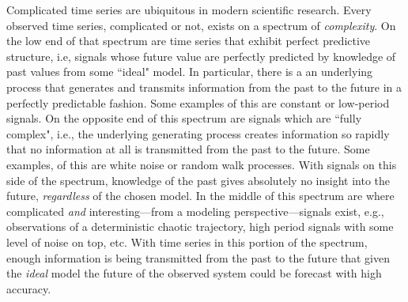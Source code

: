 



%


Complicated time series are ubiquitous in modern scientific research.
Every observed time series, complicated or not, exists on a spectrum of \emph{complexity}. On the low end of that spectrum are time series that exhibit perfect predictive structure, i.e, signals whose future value are perfectly predicted by knowledge of past values from some ``ideal" model. In particular, there is a an underlying process that generates and transmits information from the past to the future in a perfectly predictable fashion. Some examples of this are constant or low-period signals. On the opposite end of this spectrum are signals which are ``fully complex", i.e., the underlying generating process creates information so rapidly that no information at all is transmitted from the past to the future. Some examples, of this are white noise or random walk processes. With signals on this side of the spectrum, knowledge of the past gives absolutely no insight into the future, \emph{regardless} of the chosen model.  In the middle of this spectrum are where complicated \emph{and} interesting---from a modeling perspective---signals exist, e.g., observations of a deterministic chaotic trajectory, high period signals with some level of noise on top, etc. With time series in this portion of the spectrum, enough information is being transmitted from the past to the future that given the \emph{ideal} model the future of the observed system could be forecast with high accuracy.

